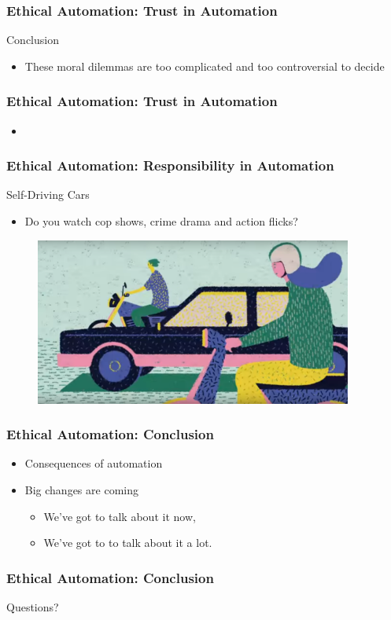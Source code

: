 \begin{frame}
  \frametitle{ Ethical Automation: Trust in Automation}
  {\Large Conclusion}
  \begin{itemize}
  \item These moral dilemmas are too complicated and too controversial to decide
  \end{itemize}
\end{frame}


\begin{frame}
  \frametitle{ Ethical Automation: Trust in Automation}
  \begin{itemize}
  \item
  \end{itemize}
\end{frame}


\begin{frame}
	\frametitle{ Ethical Automation: Responsibility in Automation}
	{\Large Self-Driving Cars}
	\begin{itemize}
		\item Do you watch cop shows, crime drama and action flicks?
	\end{itemize}
	\begin{figure}[bht]
		\centering
		\includegraphics[width=4.1in]{diagrams/image01}
		\caption{}
		\label{fig:-deg}
	\end{figure}
\end{frame}

\begin{frame}
  \frametitle{ Ethical Automation: Conclusion}
  \begin{itemize}
  \item Consequences of automation
  \item Big changes are coming
    \begin{itemize}
    \item We've got to talk about it now,
    \item We've got to to talk about it a lot.
    \end{itemize}
  \end{itemize}
\end{frame}


\begin{frame}
  \frametitle{ Ethical Automation: Conclusion}
  \Large Questions?
\end{frame}
